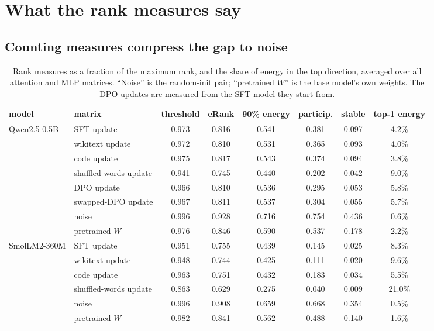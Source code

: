 \section{What the rank measures say}
\label{sec:results}

\subsection{Counting measures compress the gap to noise}
\label{sec:metrics}

\begin{table}[t]
\caption{Rank measures as a fraction of the maximum rank, and the share of
energy in the top direction, averaged over all attention and MLP matrices.
``Noise'' is the random-init pair; ``pretrained $W$'' is the base model's own
weights. The DPO updates are measured from the SFT model they start from.}
\label{tab:measures}
\begin{center}
\small
\begin{tabular}{llcccccc}
\toprule
model & matrix & threshold & eRank & 90\% energy & particip. & stable & top-1 energy \\
\midrule
Qwen2.5-0.5B & SFT update            & 0.973 & 0.816 & 0.541 & 0.381 & 0.097 & 4.2\% \\
             & wikitext update       & 0.972 & 0.810 & 0.531 & 0.365 & 0.093 & 4.0\% \\
             & code update           & 0.975 & 0.817 & 0.543 & 0.374 & 0.094 & 3.8\% \\
             & shuffled-words update & 0.941 & 0.745 & 0.440 & 0.202 & 0.042 & 9.0\% \\
             & DPO update            & 0.966 & 0.810 & 0.536 & 0.295 & 0.053 & 5.8\% \\
             & swapped-DPO update    & 0.967 & 0.811 & 0.537 & 0.304 & 0.055 & 5.7\% \\
             & noise                 & 0.996 & 0.928 & 0.716 & 0.754 & 0.436 & 0.6\% \\
             & pretrained $W$        & 0.976 & 0.846 & 0.590 & 0.537 & 0.178 & 2.2\% \\
\midrule
SmolLM2-360M & SFT update            & 0.951 & 0.755 & 0.439 & 0.145 & 0.025 & 8.3\% \\
             & wikitext update       & 0.948 & 0.744 & 0.425 & 0.111 & 0.020 & 9.6\% \\
             & code update           & 0.963 & 0.751 & 0.432 & 0.183 & 0.034 & 5.5\% \\
             & shuffled-words update & 0.863 & 0.629 & 0.275 & 0.040 & 0.009 & 21.0\% \\
             & noise                 & 0.996 & 0.908 & 0.659 & 0.668 & 0.354 & 0.5\% \\
             & pretrained $W$        & 0.982 & 0.841 & 0.562 & 0.488 & 0.140 & 1.6\% \\
\bottomrule
\end{tabular}
\end{center}
\end{table}

